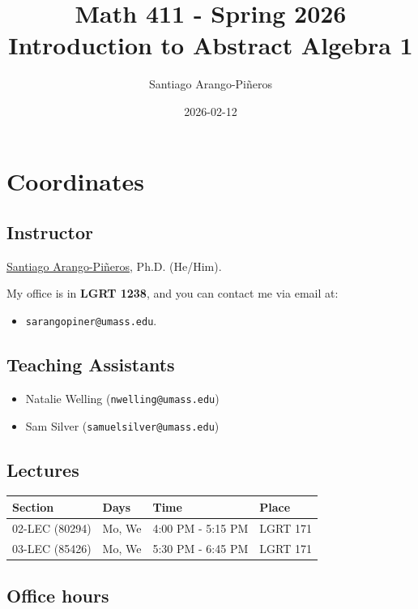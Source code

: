 \documentclass[11pt]{article}
\author{Santiago Arango-Piñeros}
\date{2026-02-12}
\title{Math 411 - Spring 2026\\\medskip
\large Introduction to Abstract Algebra 1}
\begin{document}
\maketitle
\tableofcontents


\section*{Coordinates}
\label{sec:org0545789}
\subsection*{Instructor}
\label{sec:org7ea8ca7}
\href{https://sarangop1728.github.io/}{Santiago Arango-Piñeros}, Ph.D. (He/Him).


My office is in \textbf{LGRT 1238}, and you can contact me via email at:
\begin{itemize}
\item \texttt{sarangopiner@umass.edu}.
\end{itemize}

\subsection*{Teaching Assistants}
\label{sec:orgcf889b9}
\begin{itemize}
\item Natalie Welling (\texttt{nwelling@umass.edu})
\item Sam Silver (\texttt{samuelsilver@umass.edu})
\end{itemize}

\subsection*{Lectures}
\label{sec:org45fc277}
\begin{center}
\begin{tabular}{l|l|l|l}
\hline
Section & Days & Time & Place\\[0pt]
\hline
02-LEC (80294) & Mo, We & 4:00 PM - 5:15 PM & LGRT 171\\[0pt]
03-LEC (85426) & Mo, We & 5:30 PM - 6:45 PM & LGRT 171\\[0pt]
\hline
\end{tabular}
\end{center}

\subsection*{Office hours}
\label{sec:org41a2627}
\end{document}
